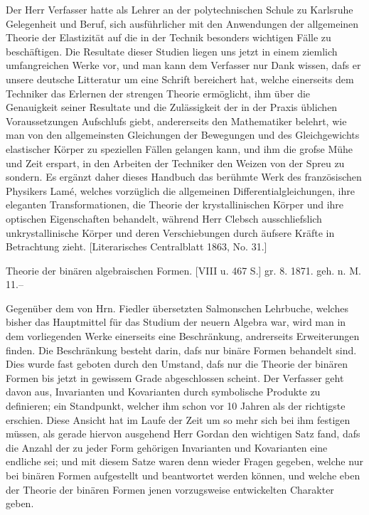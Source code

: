 \documentclass[11pt]{article}
\begin{document}
\glqq{}Der Herr Verfasser hatte als Lehrer an der polytechnischen Schule zu Karlsruhe Gelegenheit und Beruf, sich ausf\"uhrlicher mit den Anwendungen der allgemeinen Theorie der Elastizit\"at auf die in der Technik besonders wichtigen F\"alle zu besch\"aftigen. Die Resultate dieser Studien liegen uns jetzt in einem ziemlich umfangreichen Werke vor, und man kann dem Verfasser nur Dank wissen, dafs er unsere deutsche Litteratur um eine Schrift bereichert hat, welche einerseits dem Techniker das Erlernen der strengen Theorie erm\"oglicht, ihm \"uber die Genauigkeit seiner Resultate und die Zul\"assigkeit der in der Praxis \"ublichen Voraussetzungen Aufschlufs giebt, andererseits den Mathematiker belehrt, wie man von den allgemeinsten Gleichungen der Bewegungen und des Gleichgewichts elastischer K\"orper zu speziellen F\"allen gelangen kann, und ihm die grofse M\"uhe und Zeit erspart, in den Arbeiten der Techniker den Weizen von der Spreu zu sondern. Es erg\"anzt daher dieses Handbuch das ber\"uhmte Werk des franz\"osischen Physikers Lam\'e, welches vorz\"uglich die allgemeinen Differentialgleichungen, ihre eleganten Transformationen, die Theorie der krystallinischen K\"orper und ihre optischen Eigenschaften behandelt, w\"ahrend Herr Clebsch ausschliefslich unkrystallinische K\"orper und deren Verschiebungen durch \"aufsere Kr\"afte in Betrachtung zieht.\grqq{} \hfill [Literarisches Centralblatt 1863, No. 31.]

\textemdash{} Theorie der bin\"aren algebraischen Formen. [VIII u. 467 S.] gr. 8. 1871. geh. \hfill n. M. 11.--

Gegen\"uber dem von Hrn. Fiedler \"ubersetzten Salmonschen Lehrbuche, welches bisher das Hauptmittel f\"ur das Studium der neuern Algebra war, wird man in dem vorliegenden Werke einerseits eine Beschr\"ankung, andrerseits Erweiterungen finden. Die Beschr\"ankung besteht darin, dafs nur bin\"are Formen behandelt sind. Dies wurde fast geboten durch den Umstand, dafs nur die Theorie der bin\"aren Formen bis jetzt in gewissem Grade abgeschlossen scheint. Der Verfasser geht davon aus, Invarianten und Kovarianten durch symbolische Produkte zu definieren; ein Standpunkt, welcher ihm schon vor 10 Jahren als der richtigste erschien. Diese Ansicht hat im Laufe der Zeit um so mehr sich bei ihm festigen m\"ussen, als gerade hiervon ausgehend Herr Gordan den wichtigen Satz fand, dafs die Anzahl der zu jeder Form geh\"origen Invarianten und Kovarianten eine endliche sei; und mit diesem Satze waren denn wieder Fragen gegeben, welche nur bei bin\"aren Formen aufgestellt und beantwortet werden k\"onnen, und welche eben der Theorie der bin\"aren Formen jenen vorzugsweise entwickelten Charakter geben.
\end{document}
